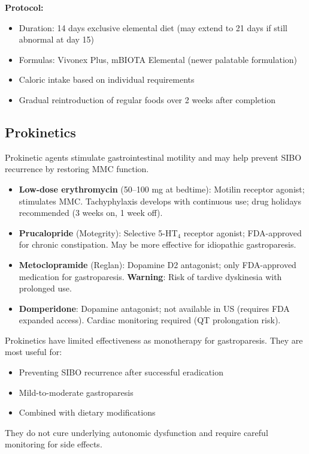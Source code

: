 \textbf{Protocol:}
\begin{itemize}
    \item Duration: 14 days exclusive elemental diet (may extend to 21 days if still abnormal at day 15)
    \item Formulas: Vivonex Plus, mBIOTA Elemental (newer palatable formulation)
    \item Caloric intake based on individual requirements
    \item Gradual reintroduction of regular foods over 2 weeks after completion
\end{itemize}

\subsection{Prokinetics}
\label{subsec:prokinetics}

Prokinetic agents stimulate gastrointestinal motility and may help prevent SIBO recurrence by restoring MMC function.

\begin{itemize}
    \item \textbf{Low-dose erythromycin} (50--100 mg at bedtime): Motilin receptor agonist; stimulates MMC. Tachyphylaxis develops with continuous use; drug holidays recommended (3 weeks on, 1 week off).

    \item \textbf{Prucalopride} (Motegrity): Selective 5-HT$_4$ receptor agonist; FDA-approved for chronic constipation. May be more effective for idiopathic gastroparesis.

    \item \textbf{Metoclopramide} (Reglan): Dopamine D2 antagonist; only FDA-approved medication for gastroparesis. \textbf{Warning}: Risk of tardive dyskinesia with prolonged use.

    \item \textbf{Domperidone}: Dopamine antagonist; not available in US (requires FDA expanded access). Cardiac monitoring required (QT prolongation risk).
\end{itemize}

\begin{warning}
Prokinetics have limited effectiveness as monotherapy for gastroparesis. They are most useful for:
\begin{itemize}
    \item Preventing SIBO recurrence after successful eradication
    \item Mild-to-moderate gastroparesis
    \item Combined with dietary modifications
\end{itemize}
They do not cure underlying autonomic dysfunction and require careful monitoring for side effects.
\end{warning}

